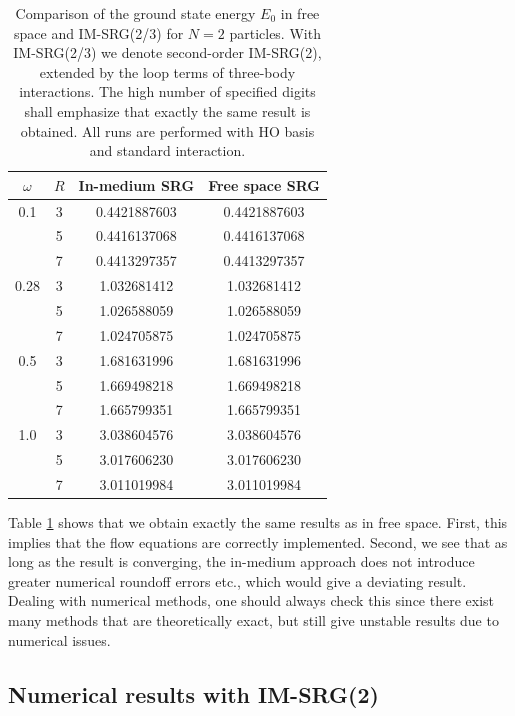 \begin{table}
\begin{center}
\begin{tabular}{cccc}
\hline\hline
$\omega$ & $R$ & In-medium SRG& Free space SRG \\
\hline
0.1 & 3 & 0.4421887603&0.4421887603  \\
& 5 &  0.4416137068& 0.4416137068\\
& 7 &0.4413297357 & 0.4413297357\\
\hline
0.28 & 3 &1.032681412 &1.032681412 \\
& 5 &1.026588059 & 1.026588059\\
& 7 & 1.024705875 & 1.024705875 \\
\hline
0.5 & 3 &1.681631996 &1.681631996 \\
& 5 &1.669498218 &1.669498218 \\
& 7 &1.665799351 &1.665799351 \\
\hline
1.0 & 3 &3.038604576 &3.038604576 \\
& 5 & 3.017606230& 3.017606230\\
& 7 & 3.011019984& 3.011019984\\
\hline\hline
\end{tabular}
\caption{Comparison of the ground state energy $E_0$ in free space and IM-SRG(2/3) for $N=2$ particles. With IM-SRG(2/3) we denote second-order IM-SRG(2), extended by the loop terms of three-body interactions. The high number of specified digits shall emphasize that exactly the same result is obtained. 
All runs are performed with HO basis and standard interaction.}
\label{tab:CompIMFree}
\end{center}
\end{table}

Table \ref{tab:CompIMFree} shows that we obtain exactly the same results as in free space. First, this implies that the flow equations are correctly implemented. Second, we see that as long as the result is converging, the in-medium approach does not introduce greater numerical roundoff errors etc., which would give a deviating result. Dealing with numerical methods, one should always check this since there exist many methods that are theoretically exact, but still give unstable results due to numerical issues.

\subsection{Numerical results with IM-SRG(2)}

